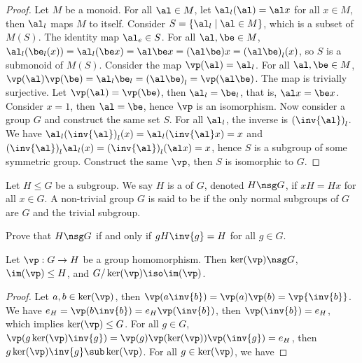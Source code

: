 \documentclass[10pt]{article}
\begin{document}
\begin{proof}
    Let $M$ be a monoid. For all $\al\in M$, let ${\al}_{l}(\al)=\al x$ for all $x\in M$, then ${\al}_{l}$ maps $M$ to itself. Consider $S=\{{\al}_{l}\mid\al\in M\}$, which is a subset of $M(S)$. The identity map ${\al}_{e}\in S$. For all $\al,\be\in M$, ${\al}_{l}({\be}_{l}(x))={\al}_{l}(\be x)=\al\be x=(\al\be)x={(\al\be)}_{l}(x)$, so $S$ is a submonoid of $M(S)$. Consider the map $\vp(\al)={\al}_{l}$. For all $\al,\be\in M$, $\vp(\al)\vp(\be)={\al}_{l}{\be}_{l}={(\al\be)}_{l}=\vp(\al\be)$. The map is trivially surjective. Let $\vp(\al)=\vp(\be)$, then ${\al}_{l}={\be}_{l}$, that is, $\al x=\be x$. Consider $x=1$, then $\al=\be$, hence $\vp$ is an isomorphism. Now consider a group $G$ and construct the same set $S$. For all ${\al}_{l}$, the inverse is ${(\inv{\al})}_{l}$. We have ${\al}_{l}{(\inv{\al})}_{l}(x)={\al}_{l}(\inv{\al}x)=x$ and ${(\inv{\al})}_{l}{\al}_{l}(x)={(\inv{\al})}_{l}(\al x)=x$, hence $S$ is a subgroup of some symmetric group. Construct the same $\vp$, then $S$ is isomorphic to $G$.
\end{proof}
\begin{definition}
    Let $H\le G$ be a subgroup. We say $H$ is a  of $G$, denoted $H\nsg G$, if $xH=Hx$ for all $x\in G$. A non-trivial group $G$ is said to be  if the only normal subgroups of $G$ are $G$ and the trivial subgroup.
\end{definition}
\begin{problem}
    Prove that $H\nsg G$ if and only if $gH\inv{g}=H$ for all $g\in G$.
\end{problem}
\begin{theorem}
    Let $\vp:G\to H$ be a group homomorphism. Then $\ker(\vp)\nsg G$, $\im(\vp)\le H$, and $G/\ker(\vp)\iso\im(\vp)$.
\end{theorem}
\begin{center}
\end{center}
\begin{proof}
    Let $a,b\in\ker(\vp)$, then $\vp(a\inv{b})=\vp(a)\vp(b)=\vp{\inv{b}}$. We have ${e}_{H}=\vp(b\inv{b})={e}_{H}\vp(\inv{b})$, then $\vp({\inv{b}})={e}_{H}$, which implies $\ker(\vp)\le G$. For all $g\in G$, $\vp(g\ker(\vp)\inv{g})=\vp(g)\vp(\ker(\vp))\vp(\inv{g})={e}_{H}$, then $g\ker(\vp)\inv{g}\sub\ker(\vp)$. For all $g\in\ker(\vp)$, we have 
\end{proof}
\end{document}
